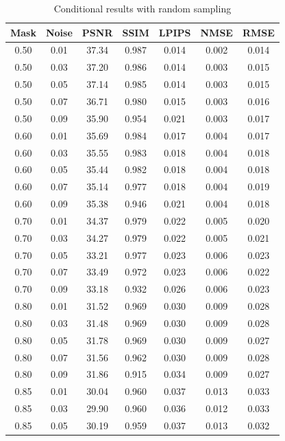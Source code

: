 
\begin{table}[htbp]
\centering
\caption{Conditional results with random sampling}
\label{tab:cond_random}
\begin{tabular}{ccccccc}
\toprule
Mask & Noise & PSNR & SSIM & LPIPS & NMSE & RMSE \\\midrule
0.50 & 0.01 & 37.34 & 0.987 & 0.014 & 0.002 & 0.014 \\
0.50 & 0.03 & 37.20 & 0.986 & 0.014 & 0.003 & 0.015 \\
0.50 & 0.05 & 37.14 & 0.985 & 0.014 & 0.003 & 0.015 \\
0.50 & 0.07 & 36.71 & 0.980 & 0.015 & 0.003 & 0.016 \\
0.50 & 0.09 & 35.90 & 0.954 & 0.021 & 0.003 & 0.017 \\
0.60 & 0.01 & 35.69 & 0.984 & 0.017 & 0.004 & 0.017 \\
0.60 & 0.03 & 35.55 & 0.983 & 0.018 & 0.004 & 0.018 \\
0.60 & 0.05 & 35.44 & 0.982 & 0.018 & 0.004 & 0.018 \\
0.60 & 0.07 & 35.14 & 0.977 & 0.018 & 0.004 & 0.019 \\
0.60 & 0.09 & 35.38 & 0.946 & 0.021 & 0.004 & 0.018 \\
0.70 & 0.01 & 34.37 & 0.979 & 0.022 & 0.005 & 0.020 \\
0.70 & 0.03 & 34.27 & 0.979 & 0.022 & 0.005 & 0.021 \\
0.70 & 0.05 & 33.21 & 0.977 & 0.023 & 0.006 & 0.023 \\
0.70 & 0.07 & 33.49 & 0.972 & 0.023 & 0.006 & 0.022 \\
0.70 & 0.09 & 33.18 & 0.932 & 0.026 & 0.006 & 0.023 \\
0.80 & 0.01 & 31.52 & 0.969 & 0.030 & 0.009 & 0.028 \\
0.80 & 0.03 & 31.48 & 0.969 & 0.030 & 0.009 & 0.028 \\
0.80 & 0.05 & 31.78 & 0.969 & 0.030 & 0.009 & 0.027 \\
0.80 & 0.07 & 31.56 & 0.962 & 0.030 & 0.009 & 0.028 \\
0.80 & 0.09 & 31.86 & 0.915 & 0.034 & 0.009 & 0.027 \\
0.85 & 0.01 & 30.04 & 0.960 & 0.037 & 0.013 & 0.033 \\
0.85 & 0.03 & 29.90 & 0.960 & 0.036 & 0.012 & 0.033 \\
0.85 & 0.05 & 30.19 & 0.959 & 0.037 & 0.013 & 0.032 \\

\end{tabular}
\end{table}
